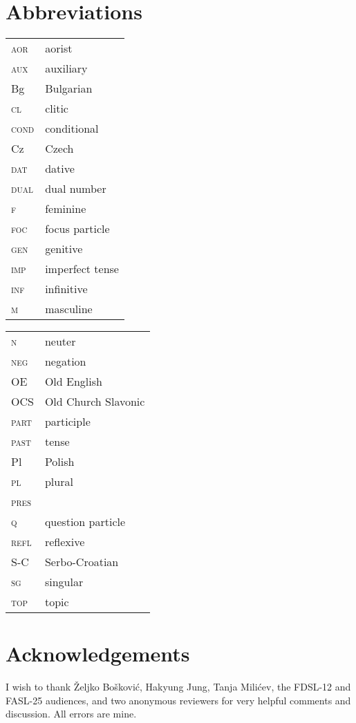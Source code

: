 \documentclass[output=paper,modfonts,newtxmath,hidelinks]{langscibook}
\begin{document}
\section*{Abbreviations}

\begin{tabularx}{.5\textwidth}{@{}lQ@{}}
\textsc{aor}&aorist\\
\textsc{aux}&auxiliary\\
Bg&{Bulgarian}\\
\textsc{cl}&{clitic}\\
\textsc{cond}&conditional\\
Cz&{Czech}\\
\textsc{dat}&{dative}\\ 
\textsc{dual}&dual number\\
\textsc{f}&{feminine}\\
\textsc{foc}&focus particle\\
\textsc{gen}&{genitive}\\
\textsc{imp}&imperfect tense\\
\textsc{inf}&{infinitive}\\
\textsc{m}&{masculine}\\
\end{tabularx}%
\begin{tabularx}{.5\textwidth}{@{}lQ@{}}
\textsc{n}&{neuter}\\
\textsc{neg}&{negation}\\
OE&Old {English}\\
OCS&Old Church {Slavonic}\\
\textsc{part}&{participle}\\
\textsc{past}&{ tense}\\
Pl&{Polish}\\
\textsc{pl}&{plural}\\
\textsc{pres}&\\
\textsc{q}&question particle\\
\textsc{refl}&reflexive\\
S-C&Serbo-{Croatian}\\
\textsc{sg}&singular\\
\textsc{top}&topic\\
\end{tabularx}

\section*{Acknowledgements}

I wish to thank Željko Bošković, Hakyung Jung, Tanja Milićev, the FDSL-12 and FASL-25 audiences, and two anonymous reviewers for very helpful comments and discussion. All errors are mine.

\sloppy
\printbibliography[heading=subbibliography,notkeyword=this]
\end{document}
